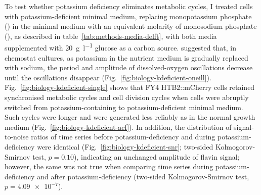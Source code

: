 To test whether potassium deficiency eliminates metabolic cycles, I treated cells with potassium-deficient minimal medium, replacing monopotassium phosphate () in the minimal medium with an equivalent molarity of monosodium phosphate (), as described in table~\ref{tab:methods-media-delft}, with both media supplemented with \SI{20}{\gram~\litre^{-1}} glucose as a carbon source.
\textcite{oneillEukaryoticCellBiology2020} suggested that, in chemostat cultures, as potassium in the nutrient medium is gradually replaced with sodium, the period and amplitude of dissolved-oxygen oscillations decrease until the oscillations disappear (Fig.\ \ref{fig:biology-kdeficient-oneill}).
Fig.\ \ref{fig:biology-kdeficient-single} shows that FY4 HTB2::mCherry cells retained synchronised metabolic cycles and cell division cycles when cells were abruptly switched from potassium-containing to potassium-deficient minimal medium.
Such cycles were longer and were generated less reliably as in the normal growth medium (Fig.\ \ref{fig:biology-kdeficient-acf}).
In addition, the distribution of signal-to-noise ratios of time series before potassium-deficiency and during potassium-deficiency were identical (Fig.\ \ref{fig:biology-kdeficient-snr}; two-sided Kolmogorov-Smirnov test, $p = \num{0.10}$), indicating an unchanged amplitude of flavin signal; however, the same was not true when comparing time series during potassium-deficiency and after potassium-deficiency (two-sided Kolmogorov-Smirnov test, $p = \num{4.09e-7}$).

